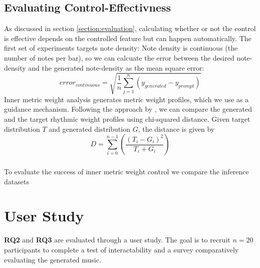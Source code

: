 \subsection{Evaluating Control-Effectivness}
As discussed in section \ref{section:evaluation}, calculating whether or not the control is effective depends on the controlled feature but can happen automatically. 
The first set of experiments targets note density: 
Note density is continuous (the number of notes per bar), so we can calcuate the error between the desired note-density and the generated note-density as the mean square error: 
\begin{equation}
 error_{continuous} = \sqrt{\frac{1}{n}\sum_{j=1}^{n}(y_{generated}-y_{prompt})}
\end{equation}
Inner metric weight analysis generates metric weight profiles, which we use as a guidance mechanism. Following the approach by \cite{Bemman2024}, we can compare the generated and the target rhythmic weight profiles using chi-squared distance.
Given target distribution $T$ and generated distribution $G$, the distance is given by 
\begin{equation}
D=\sum_{i=0}^{n-1}(\frac{(T_i-G_i)^2}{T_i+G_i})
\end{equation}
\subsubsection{}
To evaluate the success of inner metric weight control we compare the inference datasets 
\section{User Study}
\textbf{RQ2} and \textbf{RQ3} are evaluated through a user study. The goal is to recruit $n=20$ participants to complete a test of interactability and a survey comparatively evaluating the generated music. 
